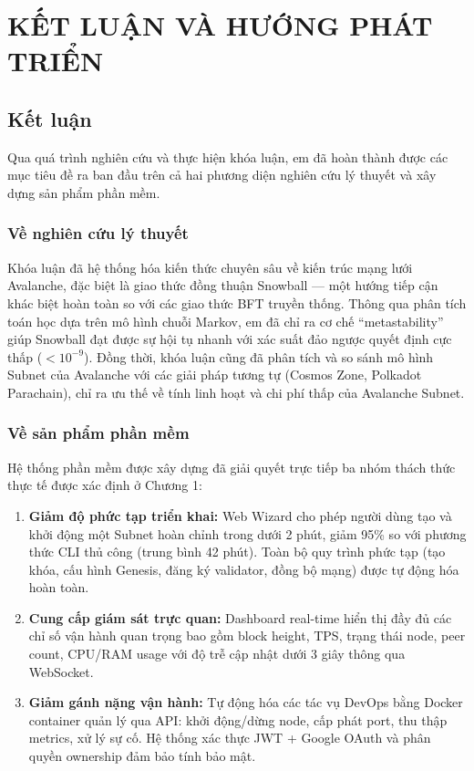 \chapter{KẾT LUẬN VÀ HƯỚNG PHÁT TRIỂN}

\section{Kết luận}

Qua quá trình nghiên cứu và thực hiện khóa luận, em đã hoàn thành được các mục tiêu đề ra ban đầu trên cả hai phương diện nghiên cứu lý thuyết và xây dựng sản phẩm phần mềm.

\subsection{Về nghiên cứu lý thuyết}

Khóa luận đã hệ thống hóa kiến thức chuyên sâu về kiến trúc mạng lưới Avalanche, đặc biệt là giao thức đồng thuận Snowball --- một hướng tiếp cận khác biệt hoàn toàn so với các giao thức BFT truyền thống. Thông qua phân tích toán học dựa trên mô hình chuỗi Markov, em đã chỉ ra cơ chế ``metastability'' giúp Snowball đạt được sự hội tụ nhanh với xác suất đảo ngược quyết định cực thấp ($< 10^{-9}$). Đồng thời, khóa luận cũng đã phân tích và so sánh mô hình Subnet của Avalanche với các giải pháp tương tự (Cosmos Zone, Polkadot Parachain), chỉ ra ưu thế về tính linh hoạt và chi phí thấp của Avalanche Subnet.

\subsection{Về sản phẩm phần mềm}

Hệ thống phần mềm được xây dựng đã giải quyết trực tiếp ba nhóm thách thức thực tế được xác định ở Chương 1:

\begin{enumerate}
    \item \textbf{Giảm độ phức tạp triển khai:} Web Wizard cho phép người dùng tạo và khởi động một Subnet hoàn chỉnh trong dưới 2 phút, giảm 95\% so với phương thức CLI thủ công (trung bình 42 phút). Toàn bộ quy trình phức tạp (tạo khóa, cấu hình Genesis, đăng ký validator, đồng bộ mạng) được tự động hóa hoàn toàn.

    \item \textbf{Cung cấp giám sát trực quan:} Dashboard real-time hiển thị đầy đủ các chỉ số vận hành quan trọng bao gồm block height, TPS, trạng thái node, peer count, CPU/RAM usage với độ trễ cập nhật dưới 3 giây thông qua WebSocket.

    \item \textbf{Giảm gánh nặng vận hành:} Tự động hóa các tác vụ DevOps bằng Docker container quản lý qua API: khởi động/dừng node, cấp phát port, thu thập metrics, xử lý sự cố. Hệ thống xác thực JWT + Google OAuth và phân quyền ownership đảm bảo tính bảo mật.
\end{enumerate}

